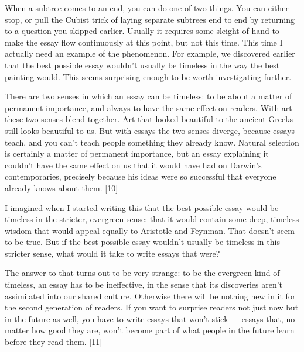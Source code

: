 When a subtree comes to an end,
                  you can do one of two things. You can either stop, or pull the
                  Cubist trick of laying separate subtrees end to end by
                  returning to a question you skipped earlier. Usually it
                  requires some sleight of hand to make the essay flow
                  continuously at this point, but not this time. This time I
                  actually need an example of the phenomenon. For example, we
                  discovered earlier that the best possible essay wouldn't
                  usually be timeless in the way the best painting would. This
                  seems surprising enough to be worth investigating further.

There
                  are two senses in which an essay can be timeless: to be about
                  a matter of permanent importance, and always to have the same
                  effect on readers. With art these two senses blend together.
                  Art that looked beautiful to the ancient Greeks still looks
                  beautiful to us. But with essays the two senses diverge,
                  because essays teach, and you can't teach people something
                  they already know. Natural selection is certainly a matter of
                  permanent importance, but an essay explaining it couldn't have
                  the same effect on us that it would have had on Darwin's
                  contemporaries, precisely because his ideas were so successful
                  that everyone already knows about them.
                  [\href{\#f10n}{10}]

I imagined when I started writing this that the
                  best possible essay would be timeless in the stricter,
                  evergreen sense: that it would contain some deep, timeless
                  wisdom that would appeal equally to Aristotle and Feynman.
                  That doesn't seem to be true. But if the best possible essay
                  wouldn't usually be timeless in this stricter sense, what
                  would it take to write essays that were?

The answer
                  to that turns out to be very strange: to be the evergreen kind
                  of timeless, an essay has to be ineffective, in the sense that
                  its discoveries aren't assimilated into our shared culture.
                  Otherwise there will be nothing new in it for the second
                  generation of readers. If you want to surprise readers not
                  just now but in the future as well, you have to write essays
                  that won't stick --- essays that, no matter how good they
                  are, won't become part of what people in the future learn
                  before they read them.
                  [\href{\#f11n}{11}]

